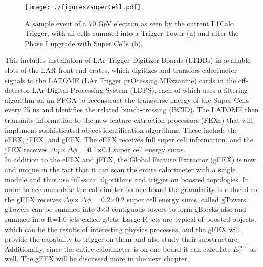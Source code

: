 \begin{figure}[h!]
  \centering
	\texttt{[image: ./figures/superCell.pdf]}
\caption{\label{fig:superCell}{ A sample event of a 70 GeV electron as seen by the current L1Calo Trigger, with all cells summed into a Trigger Tower (a) and after the Phase I upgrade with Super Cells (b). }} %
\end{figure}


This includes installation of LAr Trigger Digitizer Boards (LTDBs) in available slots of the LAR front-end crates, which digitizes and transfers calorimeter signals to the LATOME (LAr Trigger prOcessing MEzzanine) cards in the off-detector LAr Digital Processing System (LDPS), each of which uses a filtering algorithm on an FPGA to reconstruct the transverse energy of the Super Cells every 25 ns and identifies the related bunch-crossing (BCID).  The LATOME then transmits information to the new feature extraction processors (FEXs) that will implement sophisticated object identification algorithms.  These include the eFEX, jFEX, and gFEX.  The eFEX receives full super cell information, and the jFEX receives $\Delta\eta \times \Delta\phi$ = 0.1$\times$0.1 super cell energy sums. \\%

In addition to the eFEX and jFEX, the Global Feature Extractor (gFEX) is new and unique in the fact that it can scan the entire calorimeter with a single module and thus use full-scan algorithms and trigger on boosted topologies.  In order to accommodate the calorimeter on one board the granularity is reduced so the gFEX receives $\Delta\eta \times \Delta\phi$ = 0.2$\times$0.2 super cell energy sums, called gTowers.  gTowers can be summed into 3$\times$3 contiguous towers to form gBlocks also and summed into R=1.0 jets called gJets.  Large R jets are typical of boosted objects, which can be the results of interesting physics processes, and the gFEX will provide the capability to trigger on them and also study their substructure.  Additionally, since the entire calorimeter is on one board it can calculate $E_{\mathrm{T}}^{\mathrm{miss}}$ as well.  The gFEX will be discussed more in the next chapter.  \\%


